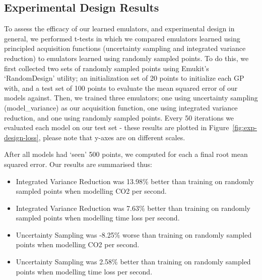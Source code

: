 

\subsection{Experimental Design Results}



To assess the efficacy of our learned emulators, and experimental design in general, we performed t-tests in which we compared emulators learned using principled acquisition functions (uncertainty sampling and integrated variance reduction) to emulators learned using randomly sampled points. To do this, we first collected two sets of randomly sampled points using Emukit's `RandomDesign' utility; an initialization set of 20 points to initialize each GP with, and a test set of 100 points to evaluate the mean squared error of our models against. Then, we trained three emulators; one using uncertainty sampling (model\_variance) as our acquisition function, one using integrated variance reduction, and one using randomly sampled points. Every 50 iterations we evaluated each model on our test set - these results are plotted in Figure~\ref{fig:exp-design-loss}, please note that y-axes are on different scales. 

After all models had `seen' 500 points, we computed for each a final root mean squared error. Our results are summarised thus:

\begin{itemize}
    \item Integrated Variance Reduction was 13.98\% better than training on randomly sampled points when modelling CO2 per second.
    \item Integrated Variance Reduction was 7.63\% better than training on randomly sampled points when modelling time loss per second.
    \item Uncertainty Sampling was -8.25\% worse than training on randomly sampled points when modelling CO2 per second.
    \item Uncertainty Sampling was 2.58\% better than training on randomly sampled points when modelling time loss per second.
\end{itemize}

